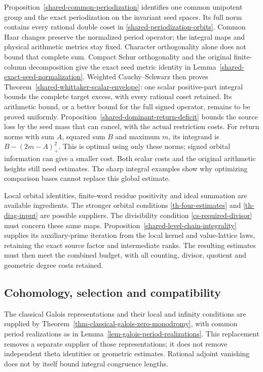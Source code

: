 Proposition~\ref{shared-common-periodization} identifies one common
unipotent group and the exact periodization on the invariant seed spaces.
Its full norm contains every rational double coset in
\eqref{shared-periodization-orbits}. Common Haar changes preserve the
normalized period operator; the integral maps and physical arithmetic
metrics stay fixed. Character orthogonality alone does not
bound that complete sum. Compact Schur orthogonality and the original
finite-column decomposition give the exact seed metric identity in
Lemma~\ref{shared-exact-seed-normalization}. Weighted Cauchy--Schwarz
then proves Theorem~\ref{shared-whittaker-scalar-envelope}: one scalar
positive-part integral bounds the complete target excess, with every
rational coset retained. Its arithmetic bound, or a better bound for
the full signed operator, remains to be proved uniformly.
Proposition~\ref{shared-dominant-return-deficit} bounds the source loss
by the seed mass that can cancel, with the actual restriction costs.
For return norms with sum $A$, squared sum $B$ and maximum $m$, its
integrand is $B-(2m-A)_+^2$. This is optimal using only these norms;
signed orbital information can give a smaller cost. Both scalar costs
and the original arithmetic heights still need estimates.
The sharp integral examples show why optimizing comparison
bases cannot replace this global estimate.

Local orbital identities, finite-word residue positivity and ideal
summation are available ingredients. The stronger orbital conditions
\eqref{th-four-estimates} and \eqref{th-diag-input} are possible suppliers.
The divisibility condition \eqref{cs-required-divisor} must concern these
same maps. Proposition~\ref{shared-level-chain-integrality} supplies
its auxiliary-prime iteration from the local kernel and value-lattice
laws, retaining the exact source factor and intermediate ranks.
The resulting estimates must then meet the combined budget,
with all counting, divisor, quotient and geometric degree costs retained.

\subsection{Cohomology, selection and compatibility}

The classical Galois representations and their local and infinity
conditions are supplied by
Theorem~\ref{thm-classical-galois-zero-monodromy}, with common period
realizations as in Lemma~\ref{lem-galois-period-realizations}.
This replacement removes a separate supplier of those representations;
it does not remove independent theta identities or geometric estimates.
Rational adjoint vanishing does not by itself bound integral congruence
lengths.

